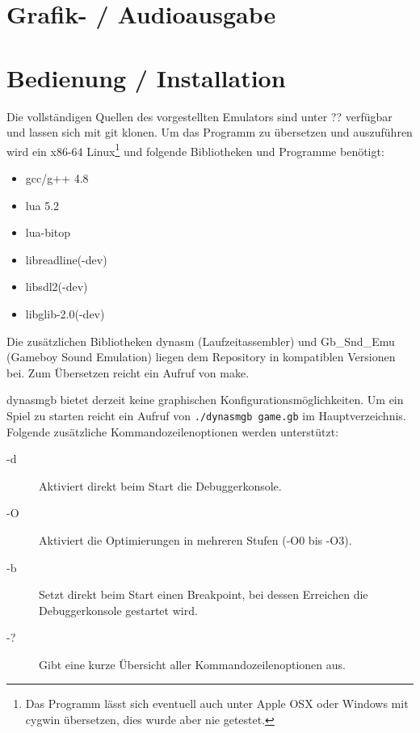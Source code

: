 \documentclass[a4paper]{scrartcl}
\begin{document}
\section{Grafik- / Audioausgabe}
\section{Bedienung / Installation}

Die vollständigen Quellen des vorgestellten Emulators sind unter ?? verfügbar und lassen sich mit git klonen. Um das Programm zu übersetzen und auszuführen wird ein x86-64 Linux\footnote{Das Programm lässt sich eventuell auch unter Apple OSX oder Windows mit cygwin übersetzen, dies wurde aber nie getestet.} und folgende Bibliotheken und Programme benötigt:

\begin{itemize}
\item gcc/g++ 4.8
\item lua 5.2
\item lua-bitop
\item libreadline(-dev)
\item libsdl2(-dev)
\item libglib-2.0(-dev)
\end{itemize}

Die zusätzlichen Bibliotheken dynasm (Laufzeitassembler) und Gb\_Snd\_Emu (Gameboy Sound Emulation) liegen dem Repository in kompatiblen Versionen bei. Zum Übersetzen reicht ein Aufruf von make.

dynasmgb bietet derzeit keine graphischen Konfigurationsmöglichkeiten. Um ein Spiel zu starten reicht ein Aufruf von \verb|./dynasmgb game.gb| im Hauptverzeichnis. Folgende zusätzliche Kommandozeilenoptionen werden unterstützt:

\begin{description}
\item[-d] Aktiviert direkt beim Start die Debuggerkonsole.
\item[-O] Aktiviert die Optimierungen in mehreren Stufen (-O0 bis -O3).
\item[-b] Setzt direkt beim Start einen Breakpoint, bei dessen Erreichen die Debuggerkonsole gestartet wird.
\item[-?] Gibt eine kurze Übersicht aller Kommandozeilenoptionen aus.
\end{description}
\end{document}
